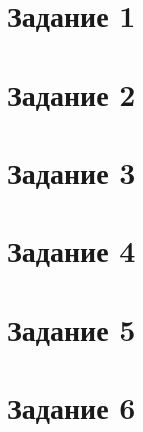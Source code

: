\documentclass[11pt]{article}
\begin{document}
\tableofcontents

\newpage %

\section{Задание 1}

\section{Задание 2}

\section{Задание 3}

\section{Задание 4}

\section{Задание 5}

\section{Задание 6}
\end{document}
